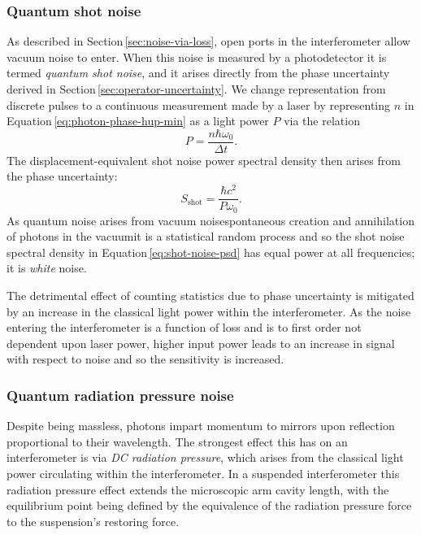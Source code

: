 \subsubsection{\label{sec:quantum-shot-noise}Quantum shot noise}
As described in Section\,\ref{sec:noise-via-loss}, open ports in the interferometer allow vacuum noise to enter. When this noise is measured by a photodetector it is termed \emph{quantum shot noise}, and it arises directly from the phase uncertainty derived in Section\,\ref{sec:operator-uncertainty}. We change representation from discrete pulses to a continuous measurement made by a laser by representing $n$ in Equation\,\ref{eq:photon-phase-hup-min} as a light power $P$ via the relation
\begin{equation}
  P = \frac{n \hbar \omega_0}{\Delta t}.
\end{equation}
The displacement-equivalent shot noise power spectral density then arises from the phase uncertainty:
\begin{equation}
  \label{eq:shot-noise-psd}
  S_{\text{shot}} = \frac{\hbar c^2}{P \omega_0}.
\end{equation}
As quantum noise arises from vacuum noise\textemdash spontaneous creation and annihilation of photons in the vacuum\textemdash it is a statistical random process and so the shot noise spectral density in Equation\,\ref{eq:shot-noise-psd} has equal power at all frequencies; it is \emph{white} noise.

The detrimental effect of counting statistics due to phase uncertainty is mitigated by an increase in the classical light power within the interferometer. As the noise entering the interferometer is a function of loss and is to first order not dependent upon laser power, higher input power leads to an increase in signal with respect to noise and so the sensitivity is increased.

\subsubsection{\label{sec:quantum-rp-noise}Quantum radiation pressure noise}
Despite being massless, photons impart momentum to mirrors upon reflection proportional to their wavelength. The strongest effect this has on an interferometer is via \emph{\gls{DC} radiation pressure}, which arises from the classical light power circulating within the interferometer. In a suspended interferometer this radiation pressure effect extends the microscopic arm cavity length, with the equilibrium point being defined by the equivalence of the radiation pressure force to the suspension's restoring force.

